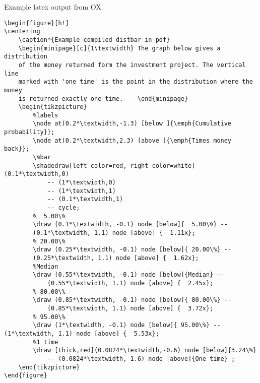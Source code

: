 \documentclass[notitlepage,a4paper]{article}
\begin{document}
Example latex output from OX.
\begin{verbatim}
\begin{figure}[h!]
\centering
    \caption*{Example compiled distbar in pdf}
    \begin{minipage}[c]{1\textwidth} The graph below gives a distribution
    of the money returned form the investment project. The vertical line
    marked with 'one time' is the point in the distribution where the money
    is returned exactly one time. 	 \end{minipage}
    \begin{tikzpicture}
        %labels
        \node at(0.2*\textwidth,-1.3) [below ]{\emph{Cumulative probability}};
        \node at(0.2*\textwidth,2.3) [above ]{\emph{Times money back}};
        \%bar
        \shadedraw[left color=red, right color=white] (0.1*\textwidth,0)
            -- (1*\textwidth,0)
            -- (1*\textwidth,1)
            -- (0.1*\textwidth,1)
            -- cycle;
        %  5.00\%
        \draw (0.1*\textwidth, -0.1) node [below]{  5.00\%} --
        (0.1*\textwidth, 1.1) node [above] {  1.11x};
        % 20.00\%
        \draw (0.25*\textwidth, -0.1) node [below]{ 20.00\%} --
        (0.25*\textwidth, 1.1) node [above] {  1.62x};
        %Median
        \draw (0.55*\textwidth, -0.1) node [below]{Median} --
            (0.55*\textwidth, 1.1) node [above] {  2.45x};
        % 80.00\%
        \draw (0.85*\textwidth, -0.1) node [below]{ 80.00\%} --
            (0.85*\textwidth, 1.1) node [above] {  3.72x};
        % 95.00\%
        \draw (1*\textwidth, -0.1) node [below]{ 95.00\%} -- (1*\textwidth, 1.1) node [above] {  5.53x};
        %1 time
        \draw [thick,red](0.0824*\textwidth,-0.6) node [below]{3.24\%}
            -- (0.0824*\textwidth, 1.6) node [above]{One time} ;
    \end{tikzpicture}
\end{figure}
\end{verbatim}
\end{document}
